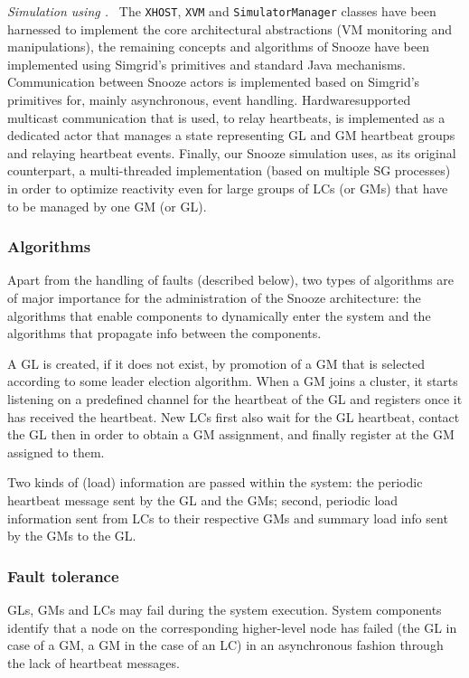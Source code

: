 \emph{Simulation using \vmps.~} The \texttt{XHOST}, \texttt{XVM} and
\texttt{SimulatorManager} classes have been harnessed to implement the
core architectural abstractions (\ie VM monitoring and manipulations),
the remaining concepts and algorithms of Snooze have been implemented
using Simgrid's primitives and standard Java mechanisms.
%
Communication between Snooze actors is implemented based on Simgrid's
primitives for, mainly asynchronous, event handling.
Hardware\-sup\-ported multicast communication that is used, \eg
to relay heartbeats, is implemented as a dedicated actor that manages
a state representing GL and GM heartbeat groups and relaying heartbeat
events.
%
Finally, our Snooze simulation uses, as its original counterpart, a
multi-threaded implementation (\ie based on multiple SG processes) in
order to optimize reactivity even for large groups of LCs (or GMs)
that have to be managed by one GM (or GL).

\subsubsection{Algorithms}
\label{sec:snoozeAlgs}

Apart from the handling of faults (described below), two types of
algorithms are of major importance for the administration of the
Snooze architecture: the algorithms that enable components to
dynamically enter the system and the algorithms that propagate info
between the components.

A GL is created, if it does not exist, by promotion of a GM that is
selected according to some leader election algorithm. When a GM joins
a cluster, it starts listening on a predefined channel for the
heartbeat of the GL and registers once it has received the
heartbeat. New LCs first also wait for the GL heartbeat, contact the
GL then in order to obtain a GM assignment, and finally register at
the GM assigned to them.

Two kinds of (load) information are passed within the system: the
periodic heartbeat message sent by the GL and the GMs; second,
periodic load information sent from LCs to their respective GMs and
summary load info sent by the GMs to the GL.

\subsubsection{Fault tolerance}

GLs, GMs and LCs may fail during the system execution. System
components identify that a node on the corresponding higher-level node
has failed (the GL in case of a GM, a GM in the case of an LC) in an
asynchronous fashion through the lack of heartbeat messages.

